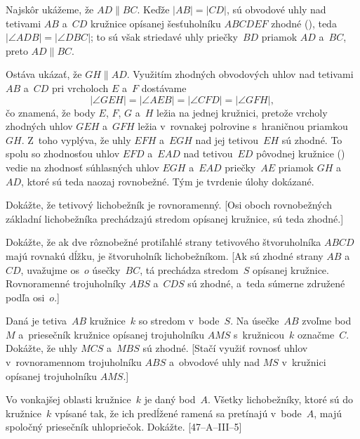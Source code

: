 {%
Najskôr ukážeme, že $AD \parallel BC$. Keďže $|AB| = |CD|$,
sú obvodové uhly nad tetivami $AB$ a~$CD$ kružnice opísanej
šesťuholníku $ABCDEF$ zhodné (\obr), teda $|\angle ADB| = |\angle DBC|$;
to sú však striedavé uhly priečky~$BD$ priamok $AD$ a~$BC$, preto
$AD \parallel BC$.

Ostáva ukázať, že $GH \parallel AD$.
%
Využitím zhodných obvodových uhlov nad tetivami $AB$ a~$CD$
pri vrcholoch $E$ a~$F$ dostávame
$$
|\angle GEH| = |\angle AEB| = |\angle CFD| = |\angle GFH|,
$$
čo znamená, že
body $E$, $F$, $G$ a~$H$ ležia na jednej kružnici, pretože
vrcholy zhodných uhlov $GEH$ a~$GFH$ ležia v~rovnakej polrovine s~hraničnou
priamkou~$GH$. Z~toho vyplýva, že
uhly $EFH$ a~$EGH$ nad jej tetivou~$EH$ sú zhodné. To spolu
so zhodnosťou uhlov $EFD$ a~$EAD$ nad tetivou~$ED$ pôvodnej kružnice ()
vedie na zhodnosť súhlasných uhlov $EGH$ a~$EAD$
priečky~$AE$ priamok $GH$ a~$AD$, ktoré sú teda naozaj rovnobežné.
Tým je tvrdenie úlohy dokázané.



Dokážte, že tetivový lichobežník je
rovnoramenný. [Osi oboch rovnobežných základní lichobežníka prechádzajú stredom
opísanej kružnice, sú teda zhodné.]

Dokážte, že ak dve rôznobežné protiľahlé strany tetivového štvoruholníka $ABCD$
majú rovnakú dĺžku, je štvoruholník lichobežníkom.
[Ak sú zhodné strany $AB$ a~$CD$, uvažujme os~$o$ úsečky~$BC$,
tá prechádza stredom~$S$ opísanej kružnice. Rovnoramenné
trojuholníky $ABS$ a~$CDS$ sú zhodné, a~teda súmerne združené podľa osi~$o$.]

\D
Daná je tetiva~$AB$ kružnice~$k$ so stredom v~bode~$S$. Na úsečke~$AB$
zvoľme bod~$M$ a~priesečník kružnice opísanej trojuholníku $AMS$
s~kružnicou~$k$ označme~$C$. Dokážte, že uhly $MCS$ a~$MBS$ sú zhodné.
[Stačí využiť rovnosť uhlov v~rovnoramennom trojuholníku $ABS$
a~obvodové uhly nad $MS$ v~kružnici opísanej trojuholníku $AMS$.]

Vo vonkajšej oblasti kružnice~$k$ je daný bod~$A$. Všetky
lichobežníky, ktoré sú do kružnice~$k$ vpísané tak, že ich
predĺžené ramená sa pretínajú v~bode~$A$, majú spoločný
priesečník uhlopriečok. Dokážte. [47--A--III--5]
}

